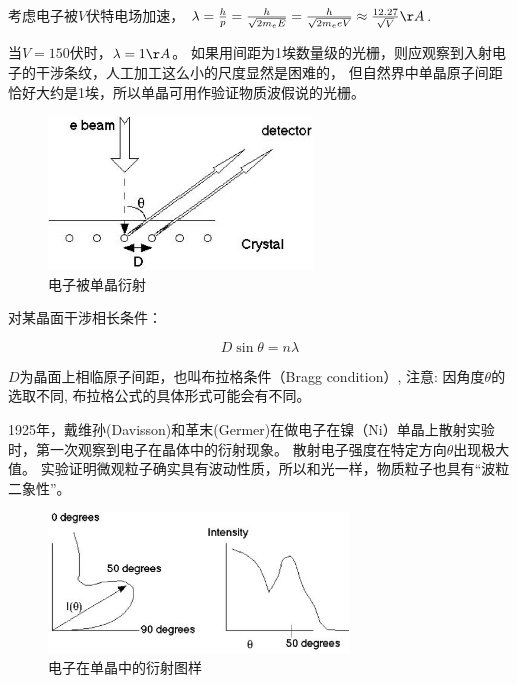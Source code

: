 考虑电子被$V$伏特电场加速， $\lambda  = \frac{h}{p} =
\frac{h}{{\sqrt {2m_e E} }} = \frac{h}{{\sqrt {2m_e eV} }} \approx
\frac{{12.27}}{{\sqrt V }} {\AA}$.

当$V=150$伏时，$\lambda  = 1 {\AA}$。
如果用间距为1埃数量级的光栅，则应观察到入射电子的干涉条纹，人工加工这么小的尺度显然是困难的，
但自然界中单晶原子间距恰好大约是1埃，所以单晶可用作验证物质波假说的光栅。

\begin{figure}[ht]
\begin{center}
\includegraphics[clip,width=7cm]{Duality/5-2.ps}
\caption{电子被单晶衍射}
\end{center}
\end{figure}


对某晶面干涉相长条件：

\begin{center}
\begin{equation}
\label{bragg condition}
    D\sin \theta  = n\lambda
\end{equation}
\end{center}

$D$为晶面上相临原子间距，也叫布拉格条件（Bragg condition）, 注意:
因角度$\theta$的选取不同, 布拉格公式的具体形式可能会有不同。



1925年，戴维孙(Davisson)和革末(Germer)在做电子在镍（Ni）单晶上散射实验时，第一次观察到电子在晶体中的衍射现象。
散射电子强度在特定方向$\theta$出现极大值。
实验证明微观粒子确实具有波动性质，所以和光一样，物质粒子也具有``波粒二象性''。



\begin{figure}[ht]
\centering
\includegraphics[width=8cm]{Duality/5-3.ps}
\caption{电子在单晶中的衍射图样}
\end{figure}



